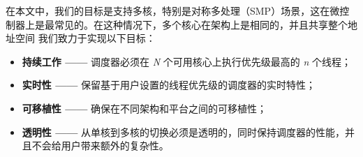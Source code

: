 

在本文中，我们的目标是支持多核，特别是对称多处理（SMP）场景，这在微控制器上是最常见的。在这种情况下，多个核心在架构上是相同的，并且共享整个地址空间
我们致力于实现以下目标：
\begin{itemize}
    \item \textbf{持续工作 ——} 调度器必须在 \textit{N} 个可用核心上执行优先级最高的 \textit{n} 个线程；
    \item \textbf{实时性 ——} 保留基于用户设置的线程优先级的调度器的实时特性；
    \item \textbf{可移植性 ——} 确保在不同架构和平台之间的可移植性；
    \item \textbf{透明性 ——} 从单核到多核的切换必须是透明的，同时保持调度器的性能，并且不会给用户带来额外的复杂性。
\end{itemize}

